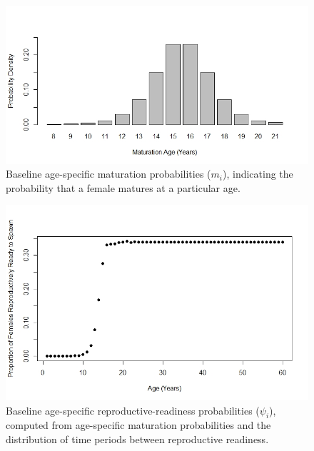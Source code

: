 \documentclass[12pt]{article}
\begin{document}
\begin{figure}[h]
\centering
\includegraphics[width=6in]{NEPA_fig_4-maturation}
\caption{Baseline age-specific maturation probabilities ($m_i$), indicating the probability that a female matures at a particular age.}
\end{figure}


\begin{figure}[h]
\centering
\includegraphics[width=6in]{NEPA_fig_5-psi}
\caption{Baseline age-specific reproductive-readiness probabilities ($\psi_i$), computed from age-specific maturation probabilities and the distribution of time periods between reproductive readiness.}
\end{figure}
\end{document}
